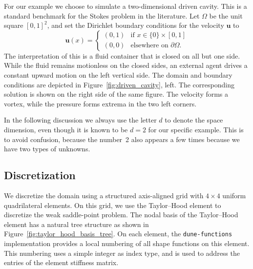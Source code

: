 \documentclass[a4paper,10pt,headings=normal,bibliography=totoc]{scrartcl}
\newcommand{\dunemodule}[1]{\texttt{#1}}
\begin{document}
For our example we choose to simulate a two-dimensional driven cavity.  This is a standard benchmark
for the Stokes problem in the literature.  Let $\Omega$ be the unit square $[0,1]^2$, and set the Dirichlet
boundary conditions for the velocity $\mathbf{u}$ to
\begin{equation*}
 \mathbf{u}(x)
 =
 \begin{cases}
  (0,1) & \text{if $x \in \{0\} \times [0,1]$} \\
  (0,0) & \text{elsewhere on $\partial \Omega$}.
 \end{cases}
\end{equation*}
The interpretation of this is a fluid container that is closed on all but one side.  While the fluid remains
motionless on the closed sides, an external agent drives a constant upward motion on the left vertical side.
The domain and boundary conditions are depicted in Figure~\ref{fig:driven_cavity}, left.
The corresponding solution is shown on the right side of the same figure.  The velocity forms a vortex,
while the pressure forms extrema in the two left corners.

In the following discussion we always use the letter $d$ to denote the space dimension, even though it is
known to be $d=2$ for our specific example.  This is to avoid confusion, because the number~2 also
appears a few times because we have two types of unknowns.

\subsection{Discretization}

We discretize the domain using a structured axis-aligned grid with $4 \times 4$ uniform quadrilateral elements.
On this grid, we use the Taylor--Hood element to discretize the weak saddle-point problem.  The nodal basis
of the Taylor--Hood element has a natural tree structure as shown in Figure~\ref{fig:taylor_hood_basis_tree}.
On each element, the \dunemodule{dune-functions} implementation provides a local numbering of all shape functions
on this element.  This numbering uses a simple integer as index type, and is used to address the entries of the
element stiffness matrix.
\end{document}

